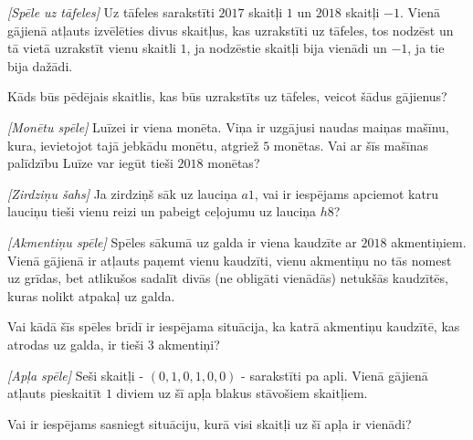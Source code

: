 






\noindent 



\begin{problem}
\textit{[Spēle uz tāfeles]}
Uz tāfeles sarakstīti $2017$ skaitļi $1$ un $2018$ skaitļi $-1$. Vienā gājienā atļauts izvēlēties divus skaitļus, kas uzrakstīti uz tāfeles, tos nodzēst un tā vietā uzrakstīt vienu skaitli $1$, ja nodzēstie skaitļi bija vienādi un $-1$, ja tie bija dažādi.

Kāds būs pēdējais skaitlis, kas būs uzrakstīts uz tāfeles, veicot šādus gājienus?

\end{problem}
%

\begin{problem}
\textit{[Monētu spēle]}
Luīzei ir viena monēta. Viņa ir uzgājusi naudas maiņas mašīnu, kura, ievietojot tajā jebkādu monētu, atgriež $5$ monētas.
Vai ar šīs mašīnas palīdzību Luīze var iegūt tieši $2018$ monētas?
\end{problem}
%

\begin{problem}
\textit{[Zirdziņu šahs]}
Ja zirdziņš sāk uz lauciņa $a1$, vai ir iespējams apciemot katru lauciņu tieši vienu reizi un pabeigt ceļojumu uz lauciņa $h8$?
\end{problem}
%

\begin{problem}
\textit{[Akmentiņu spēle]}
Spēles sākumā uz galda ir viena kaudzīte ar $2018$ akmentiņiem. Vienā gājienā ir atļauts paņemt vienu kaudzīti, vienu akmentiņu no tās nomest uz grīdas, bet atlikušos sadalīt divās (ne obligāti vienādās) netukšās kaudzītēs, kuras nolikt atpakaļ uz galda. 

Vai kādā šīs spēles brīdī ir iespējama situācija, ka katrā akmentiņu kaudzītē, kas atrodas uz galda, ir tieši $3$ akmentiņi?
\end{problem}
%

\begin{problem}
\textit{[Apļa spēle]}
Seši skaitļi - $(0,1,0,1,0,0)$ - sarakstīti pa apli. Vienā gājienā atļauts pieskaitīt $1$ diviem uz šī apļa blakus stāvošiem skaitļiem.

Vai ir iespējams sasniegt situāciju, kurā visi skaitļi uz šī apļa ir vienādi?
\end{problem}
%

